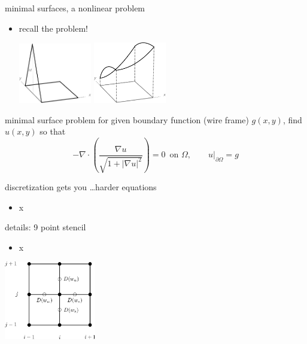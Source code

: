 \documentclass[10pt,
               svgnames,
               hyperref={colorlinks,citecolor=DeepPink4,linkcolor=FireBrick,urlcolor=Maroon},
               usepdftitle=false]{beamer}
\newcommand{\grad}{\nabla}
\newcommand{\Div}{\nabla \cdot}
\begin{document}
\begin{frame}{minimal surfaces, a nonlinear problem}
\begin{itemize}
\item recall the problem!

\vspace{-10mm}
\hfill \includegraphics[width=0.25\textwidth]{images/tent.png} \includegraphics[width=0.25\textwidth]{images/catenary.png}
\end{itemize}

\bigskip
\begin{block}{minimal surface problem} for given boundary function (wire frame) $g(x,y)$, find $u(x,y)$ so that
    $$-\Div \left(\frac{\grad u}{\sqrt{1 + |\grad u|^2}}\right) = 0 \, \text{ on } \Omega, \qquad u\big|_{\partial \Omega} = g$$
\end{block}
\end{frame}


\begin{frame}{discretization gets you \dots harder equations}
\begin{itemize}
\item x
\end{itemize}
\end{frame}


\begin{frame}{details: 9 point stencil}
\begin{itemize}
\item x
\end{itemize}

\hfill \includegraphics[width=0.3\textwidth]{images/msboxstencil.png}
\end{frame}
\end{document}
